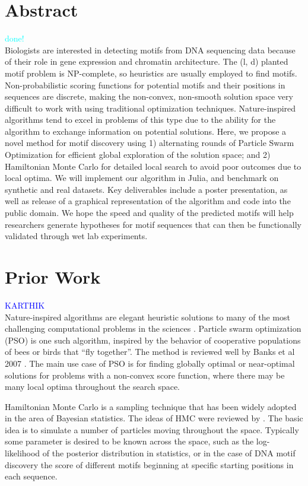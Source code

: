 \documentclass{article}
\begin{document}
\section{Abstract}
\textcolor{cyan}{done!} \\
Biologists are interested in detecting motifs from DNA sequencing data because of their role in gene expression and chromatin architecture.
The (l, d) planted motif problem is NP-complete, so heuristics are usually employed to find motifs. Non-probabilistic scoring functions for potential motifs and their positions in sequences are discrete, making the non-convex, non-smooth solution space very difficult to work with using traditional optimization techniques. Nature-inspired algorithms tend to excel in problems of this type due to the ability for the algorithm to exchange information on potential solutions. Here, we propose a novel method for motif discovery using 1) alternating rounds of Particle Swarm Optimization for efficient global exploration of the solution space; and 2) Hamiltonian Monte Carlo for detailed local search to avoid poor outcomes due to local optima. We will implement our algorithm in Julia, and benchmark on synthetic and real datasets. Key deliverables include a poster presentation, as well as release of a graphical representation of the algorithm and code into the public domain. We hope the speed and quality of the predicted motifs will help researchers generate hypotheses for motif sequences that can then be functionally validated through wet lab experiments.
\section{Prior Work}
\textcolor{blue}{KARTHIK} \\
Nature-inspired algorithms are elegant heuristic solutions to many of the most challenging computational problems in the sciences \cite{fister2013brief}. Particle swarm optimization (PSO) is one such algorithm, inspired by the behavior of cooperative populations of bees or birds that ``fly together''. The method is reviewed well by Banks et al 2007 \cite{banks2007review}. The main use case of PSO is for finding globally optimal or near-optimal solutions for problems with a non-convex score function, where there may be many local optima throughout the search space. 
  
    
Hamiltonian Monte Carlo is a sampling technique that has been widely adopted in the area of Bayesian statistics. The ideas of HMC were reviewed by \cite{betancourt2017conceptual}. The basic idea is to simulate a number of particles moving throughout the space. Typically some parameter is desired to be known across the space, such as the log-likelihood of the posterior distribution in statistics, or in the case of DNA motif discovery the score of different motifs beginning at specific starting positions in each sequence.
\end{document}
